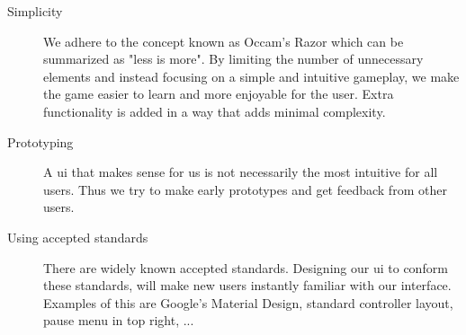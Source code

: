 		\begin{description}
			\item[Simplicity]
			We adhere to the concept known as Occam's Razor which can be summarized as "less is more". By limiting the number of unnecessary elements and instead focusing on a simple and intuitive gameplay, we make the game easier to learn and more enjoyable for the user. Extra functionality is added in a way that adds minimal complexity.
			
			\item[Prototyping]
			A \gls{ui} that makes sense for us is not necessarily the most intuitive for all users. Thus we try to make early prototypes and get feedback from other users.
			
			\item[Using accepted standards]
			There are widely known accepted standards. Designing our \gls{ui} to conform these standards, will make new users instantly familiar with our interface. Examples of this are Google's Material Design, standard controller layout, pause menu in top right, ...
			
		\end{description}
